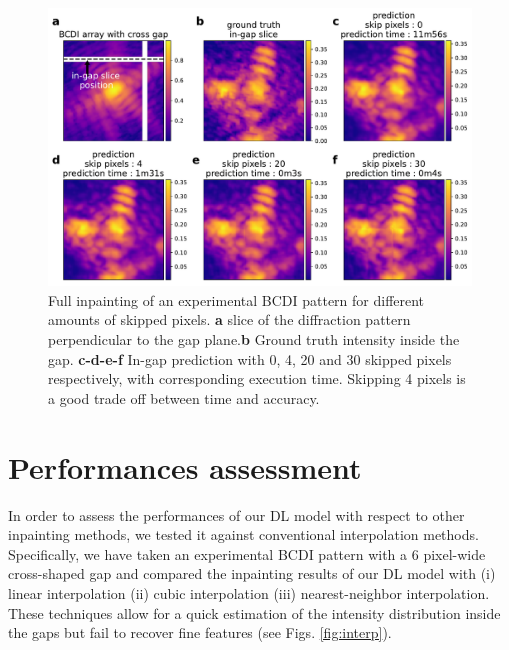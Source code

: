 \begin{figure}[h]
    \centering
    \includegraphics[width=\textwidth]{figures/Inpainting/Skip_pixels_ingap_slice.pdf}
    \caption{Full inpainting of an experimental BCDI pattern for different amounts of skipped pixels. \textbf{a}
    slice of the diffraction pattern perpendicular to the gap plane.\textbf{b} Ground truth intensity inside the gap.
    \textbf{c-d-e-f} In-gap prediction with 0, 4, 20 and 30 skipped pixels respectively, with corresponding 
    execution time. Skipping 4 pixels is a good trade off between time and accuracy.}
    \label{fig:skip_figure}
\end{figure}

\section{Performances assessment}\label{sec:performances}

In order to assess the performances of our DL model with respect to other inpainting methods, we tested it against 
conventional interpolation methods. Specifically, we have taken an experimental BCDI pattern with a 6 pixel-wide 
cross-shaped gap and compared the inpainting results of our DL model with (i) linear interpolation (ii) cubic interpolation 
(iii) nearest-neighbor interpolation. These techniques allow for a quick estimation of the intensity distribution 
inside the gaps but fail to recover fine features (see Figs. \ref{fig:interp}). 

